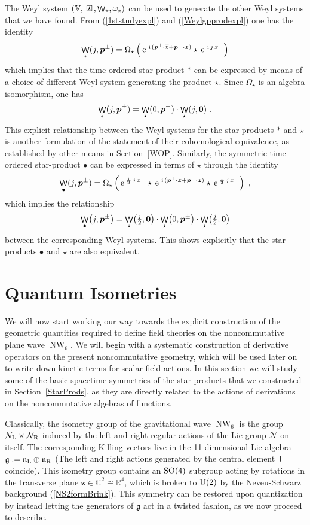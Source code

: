 \documentclass[11pt,a4paper]{article}
\DeclareMathOperator{\NW}{NW}
\DeclareMathOperator{\weyl}{{\sf W}}                   %
\newcommand{\compc}{\mkern+4mu\square\mkern-17.4mu{\mbox{
    \protect\raisebox{0.2ex}{$\star$}}\mkern+5mu}}      %
\newcommand{\1}{\mathbb{1}}
\newcommand{\mbf}[1]{{\boldsymbol {#1} }}
\def\ii{{\,{\rm i}\,}}
\def\T{{\sf T}}
\def\mz{{\mbf z}}
\def\mbp{{\mbf p}}
\def\mfn{{\mathfrak n}}
\def\mfg{{\mathfrak g}}
\def\mcN{{\mathcal N}}
\def\mbbV{{\mathbb V}}
\newcommand{\newsection}{\setcounter{equation}{0}\section}
\newcommand{\complex}{{\mathbb C}} %
\newcommand{\real}{{\mathbb R}} %
\def\e{{\,\rm e}\,}
\newcommand{\beq}{\begin{eqnarray}}
\newcommand{\eeq}{\end{eqnarray}}
\begin{document}
The Weyl system $(\mbbV,\compc,\weyl_\star,\omega_\star)$ can be used
to generate the other Weyl systems that we have found. From
(\ref{1ststudyexpl}) and (\ref{Weylgpprodexpl}) one has the identity
\beq
\weyl_*(j,\mbp^\pm)=\Omega_\star\left(
\e^{\ii(\mbf p^+\cdot\overline{\mz}
+\mbp^-\cdot\mz)}\star\e^{\ii j\, x^-}\right)
\label{weylTOWeylDelta}\eeq
which implies
that the time-ordered star-product $*$ can be expressed
by means of a choice of different Weyl system generating the product
$\star$. Since $\Omega_\star$ is an algebra isomorphism, one has
\beq
\weyl_*(j,\mbp^\pm)=\weyl_\star(0,\mbp^\pm)
\cdot\weyl_\star(j,\mbf0) \ .
\label{weylTOWeylprods}\eeq
This explicit relationship between the Weyl systems for the
star-products $*$ and $\star$ is another formulation of the statement
of their cohomological equivalence, as established by other means in
Section~\ref{WOP}. Similarly, the symmetric time-ordered star-product
$\bullet$ can be expressed in terms of $\star$ through the identity
\beq
\weyl_\bullet(j,\mbp^\pm)=\Omega_\star\left(
\e^{\frac\ii2\,j\,x^-}\star\e^{\ii(\mbp^+\cdot\overline{\mz}
+\mbp^-\cdot\mz)}\star\e^{\frac\ii2\,j\,x^-}\right) \ ,
\label{WeylTOsymWeylDelta}\eeq
which implies the relationship
\beq
\weyl_\bullet\bigl(j,\mbp^\pm\bigr)=\weyl_\star
\bigl(\mbox{$\frac j2$}
,\mbf0\bigr)\cdot\weyl_\star\bigl(0,\mbp^\pm\bigr)
\cdot\weyl_\star\bigl(\mbox{$\frac j2$},\mbf0\bigr)
\label{WeylTOsymWeylprods}\eeq
between the corresponding Weyl systems. This shows explicitly that the
star-products $\bullet$ and $\star$ are also equivalent.

\newsection{Quantum Isometries\label{Coprod}}

We will now start working our way towards the explicit construction of
the geometric quantities required to define field
theories on the noncommutative plane wave $\NW_6$. We will begin with
a systematic construction of derivative operators on the present
noncommutative geometry, which will be used later on to write down
kinetic terms for scalar field actions. In this section we will study
some of the basic spacetime symmetries of the star-products that we
constructed in Section~\ref{StarProds}, as they are directly related
to the actions of derivations on the noncommutative algebras of
functions.

Classically, the isometry group of the gravitational wave $\NW_6$ is
the group $\mcN_{\rm L}\times\mcN_{\rm R}$ induced by the left and right
regular actions of the Lie group $\mcN$ on itself. The corresponding
Killing vectors live in the 11-dimensional Lie algebra $\mfg:=\mfn_{\rm
  L}\oplus\mfn_{\rm R}$ (The left and right actions generated by the
central element $\T$ coincide). This isometry group contains an ${\rm
  SO}(4)$ subgroup acting by rotations in the transverse plane
$\mz\in\complex^2\cong\real^4$, which is broken to ${\rm U}(2)$ by the
Neveu-Schwarz background (\ref{NS2formBrink}). This symmetry can be
restored upon quantization by instead letting the generators of $\mfg$
act in a twisted fashion, as we now proceed to describe.
\end{document}
